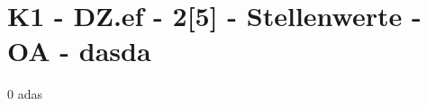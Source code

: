 \section{K1 - DZ.ef - 2[5] - Stellenwerte - OA - dasda}

\begin{langesbeispiel}\item[0] %
adas

\end{langesbeispiel}